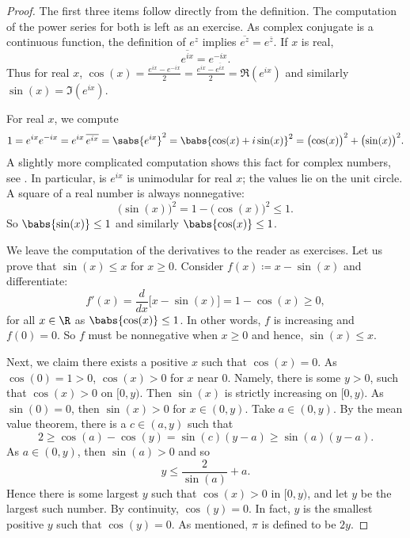 \begin{proof}
The first three items follow directly from the definition.
The computation of the power series for both is left as an exercise.
As complex conjugate is a continuous function, the definition
of $e^z$ implies
$\overline{e^z} = e^{\bar{z}}$.  If
$x$ is real,
\begin{equation*}
\overline{e^{ix}} = e^{-ix} .
\end{equation*}
Thus for real $x$,
$\cos(x) =
\frac{e^{ix}-e^{-ix}}{2} =
\frac{e^{ix}-\overline{e^{ix}}}{2} =
\Re (e^{ix})$
and similarly $\sin(x) = \Im (e^{ix})$.

For real $x$, we compute
\begin{equation*}
1 =  e^{ix} e^{-ix}
= e^{ix} \, \overline{e^{ix}}
= \sabs{e^{ix}}^2
= \babs{\cos(x) + i \sin(x)}^2
= {\bigl( \cos(x) \bigr)}^2 + {\bigl( \sin(x) \bigr)}^2 .
\end{equation*}
A slightly more complicated computation shows this fact for
complex numbers, see .
In particular, is $e^{ix}$ is unimodular for real $x$;
the values lie on the unit circle.
A square of a real number is always nonnegative:
\begin{equation*}
{\bigl(\sin(x)\bigr)}^2 = 1-{\bigl(\cos(x)\bigr)}^2 \leq 1 .
\end{equation*}
So $\babs{\sin(x)} \leq 1$ and similarly 
$\babs{\cos(x)} \leq 1$.

We leave the computation of the derivatives to the reader as exercises.
Let us prove that $\sin(x) \leq x$ for $x \geq 0$.
Consider
$f(x) \coloneqq x-\sin(x)$ and differentiate:
\begin{equation*}
f'(x) = \frac{d}{dx} \bigl[ x - \sin(x) \bigr]
=
1 -\cos(x) \geq 0 ,
\end{equation*}
for all $x \in \R$ as $\babs{\cos(x)} \leq 1$.
In other words, $f$ is increasing and $f(0) = 0$.
So $f$ must be nonnegative when $x \geq 0$ and hence, $\sin(x) \leq x$.

Next, we claim there exists a positive $x$ such that $\cos(x) = 0$.
As $\cos(0) = 1 > 0$, $\cos(x) > 0$
for $x$ near $0$.  Namely,
there is some
$y > 0$, such that $\cos(x) > 0$ on $[0,y)$.
Then $\sin(x)$ is strictly
increasing on $[0,y)$.  As $\sin(0) = 0$, then
$\sin(x) > 0$ for $x \in (0,y)$.  Take $a \in (0,y)$.  By
the mean value theorem, there is a $c \in (a,y)$ such that
\begin{equation*}
2 \geq \cos(a)-\cos(y) = \sin(c)(y-a) \geq \sin(a)(y-a) .
\end{equation*}
As $a \in (0,y)$, then $\sin(a) > 0$ and so
\begin{equation*}
y \leq \frac{2}{\sin(a)} + a .
\end{equation*}
Hence there is some largest $y$ such that $\cos(x) > 0$ in $[0,y)$,
and let $y$ be the largest such number.
By continuity, $\cos(y) = 0$.
In fact, $y$ is the
smallest positive $y$ such that $\cos(y) = 0$.  As mentioned,
$\pi$ is defined to be $2y$.


\end{proof}
